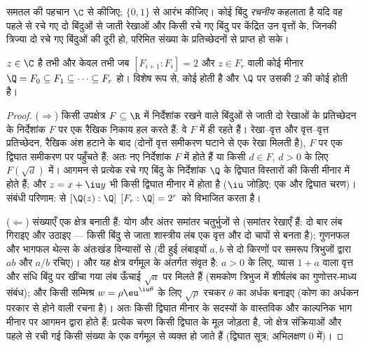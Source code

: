\begin{definition}\label{def:b3:galois:constructible}
समतल की पहचान $\C$ से कीजिए; $\{0, 1\}$ से आरंभ कीजिए। कोई बिंदु
\emph{रचनीय} कहलाता है यदि वह पहले से रचे गए
दो बिंदुओं से जाती रेखाओं और किसी रचे गए बिंदु पर केंद्रित उन
वृत्तों के, जिनकी त्रिज्या दो रचे गए बिंदुओं की दूरी हो, परिमित
संख्या के प्रतिच्छेदनों से प्राप्त हो सके।
\end{definition}

\begin{theorem}[वांत्ज़ेल]\label{thm:b3:galois:wantzel}
$z \in \C$  है तभी और केवल तभी जब $[F_{i+1} :
F_i] = 2$ और $z \in F_r$ वाली कोई मीनार
$\Q = F_0
\subseteq F_1 \subseteq \dots \subseteq F_r$ हो। विशेष रूप से, कोई   होती है और $\Q$
पर उसकी  $2$ की कोई  होती है।
\end{theorem}

\begin{proof}
($\Rightarrow$) किसी उपक्षेत्र $F \subseteq \R$ में निर्देशांक रखने वाले बिंदुओं से
जाती दो रेखाओं के प्रतिच्छेदन के निर्देशांक $F$ पर एक रैखिक
निकाय हल करते हैं: वे $F$ में ही रहते हैं। रेखा--वृत्त और
वृत्त--वृत्त प्रतिच्छेदन, रैखिक अंश हटाने के बाद (दोनों वृत्त
समीकरण घटाने से एक रेखा मिलती है), $F$ पर एक द्विघात समीकरण
पर पहुँचते हैं: अतः नए निर्देशांक $F$ में होते हैं या किसी
$d \in F$, $d > 0$ के लिए $F(\sqrt d)$ में। आगमन से प्रत्येक रचे गए बिंदु के
निर्देशांक $\Q$ के द्विघात विस्तारों की किसी मीनार में होते
हैं; और $z = x + \iu y$ भी किसी द्विघात मीनार में होता है ($\iu$ जोड़िए:
एक और द्विघात चरण)।  संबंधी परिणाम:  से $[\Q(z):\Q]$
$[F_r : \Q] = 2^r$ को विभाजित करता है।

($\Leftarrow$)  संख्याएँ एक क्षेत्र बनाती हैं: योग और अंतर
समांतर चतुर्भुजों से (समांतर रेखाएँ  हैं: दो बार लंब गिराइए
और उठाइए --- किसी बिंदु से जाता शास्त्रीय लंब एक वृत्त और दो
चापों से बनता है); गुणनफल और भागफल थेल्स के अंतःखंड विन्यासों से
(दी हुई लंबाइयों $a, b$ से दो किरणों पर समरूप त्रिभुजों द्वारा
$ab$ और $a/b$ रचिए)। और यह क्षेत्र वर्गमूल के अंतर्गत संवृत है:
$a > 0$ के लिए, व्यास $1 + a$ वाला वृत्त और संधि बिंदु पर खींचा गया
लंब ऊँचाई $\sqrt a$ पर मिलते हैं (समकोण त्रिभुज में शीर्षलंब का
गुणोत्तर-माध्य संबंध); और किसी सम्मिश्र $w = \rho\eu^{\iu\theta}$ के लिए $\sqrt\rho$ रचकर
$\theta$ का अर्धक बनाइए (कोण का अर्धकन परकार से होने वाली रचना है)।
अतः किसी द्विघात मीनार के सदस्यों के वास्तविक और काल्पनिक भाग
मीनार पर आगमन द्वारा  होते हैं: प्रत्येक चरण किसी द्विघात
के मूल जोड़ता है, जो क्षेत्र संक्रियाओं और पहले से रची गई किसी
संख्या के एक वर्गमूल से व्यक्त हो जाते हैं (द्विघात सूत्र;
अभिलक्षण $0$ में)।
\end{proof}

